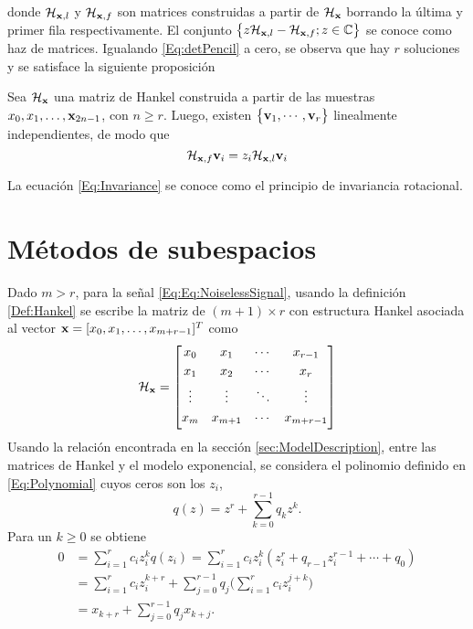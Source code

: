         	donde $\mathcal{H}_{\mathbf{x},l}$ y $\mathcal{H}_{\mathbf{x},f}$ son matrices construidas a partir de 
        	$\mathcal{H}_{\mathbf{x}}$ borrando la última y primer fila respectivamente. El conjunto $\big\{z\mathcal{H}_{\mathbf{x},l}-\mathcal{H}_{\mathbf{x},f};z\in\mathbb{C}\big\}$ se conoce como haz de matrices. Igualando \eqref{Eq:detPencil} a cero, se observa que hay $r$ soluciones y se satisface la siguiente proposición
        	\begin{prop}\label{Prop:Invariance}
        		Sea $\mathcal{H}_{\mathbf{x}}$ una matriz de Hankel construida a partir de las muestras $x_0, x_1,\ldots,\mathbf{x}_{2n-1}$, con $n\geq r$. Luego, existen $\big\{\mathbf{v}_1,\cdots,\mathbf{v}_r\big\}$ linealmente independientes, de modo que
        		\begin{equation}
        		\mathcal{H}_{\mathbf{x},f}\mathbf{v}_i = z_i\mathcal{H}_{\mathbf{x},l}\mathbf{v}_i 
        		\label{Eq:Invariance}
        		\end{equation}
        	\end{prop}
        	La ecuación \eqref{Eq:Invariance} se conoce como el principio de invariancia 
        	rotacional.
        	
        	
        
    \section{Métodos de subespacios}
        Dado $m>r$, para la señal \eqref{Eq:Eq:NoiselessSignal}, usando la definición \eqref{Def:Hankel} se escribe la matriz de $(m+1)\times r$ con estructura Hankel asociada al vector $\mathbf{x} = [x_0,x_1, \ldots,x_{m+r-1}]^T$ como
        \begin{equation}
    		\mathcal{H}_{\mathbf{x}} = \begin{bmatrix} x_0 & x_1 & \cdots & x_{r-1} \\[0.3em]										 x_1 & x_2 & \cdots & x_{r} \\[0.3em]
		      \vdots & \vdots & \ddots & \vdots \\[0.3em]
		      x_{m} & x_{m+1} & \cdots & x_{m+r-1}\\[0.3em]
		      \end{bmatrix}
		      \label{Eq:HankMatrix_1}
		\end{equation}
        Usando la relación  encontrada en la sección \ref{sec:ModelDescription}, entre las matrices de Hankel y el modelo exponencial, se considera el polinomio definido en \eqref{Eq:Polynomial} cuyos ceros son los $z_i$,
        \begin{equation} 
		      q(z) = z^{r}+\sum_{k=0}^{r-1}q_kz^{k}.
		      \label{Eq:prony_pol}
	    \end{equation}
        Para un $k\ge 0$ se obtiene
        \begin{equation}
            \begin{aligned} 
                0 & = \sum_{i=1}^r c_iz_i^kq(z_i)=\sum_{i=1}^rc_iz_i^k(z_i^r + q_{r-1}z_i^{r-1}+\cdots+q_0)  \\[0.3em]
                  & = \sum_{i=1}^rc_iz_i^{k+r} + \sum_{j=0}^{r-1}q_j\bigg(\sum_{i=1}^rc_iz_i^{j+k}\bigg) \\[0.3em]
                  & = x_{k+r} + \sum_{j=0}^{r-1}q_jx_{k+j}.
            \end{aligned}
            \label{Eq:PronyEquation}
        \end{equation}

